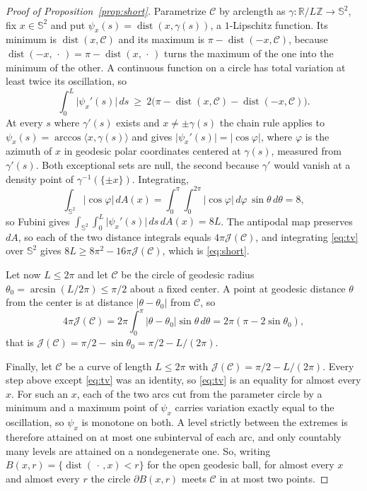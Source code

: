 \documentclass[11pt,oneside,reqno]{amsart}
\theoremstyle{plain}
\theoremstyle{definition}
\DeclareMathOperator{\dist}{dist}
\newcommand{\Sph}{\mathbb{S}^{2}}
\newcommand{\R}{\mathbb{R}}
\begin{document}
\begin{proof}[Proof of Proposition~\ref{prop:short}]
Parametrize $\mathcal{C}$ by arclength as $\gamma\colon\R/L\mathbb{Z}\to\Sph$, fix
$x\in\Sph$ and put $\psi_{x}(s)=\dist(x,\gamma(s))$, a $1$-Lipschitz function.
Its minimum is $\dist(x,\mathcal{C})$ and its maximum is
$\pi-\dist(-x,\mathcal{C})$, because $\dist(-x,\,\cdot\,)=\pi-\dist(x,\,\cdot\,)$
turns the maximum of the one into the minimum of the other. A continuous
function on a circle has total variation at least twice its oscillation, so
\begin{equation}\label{eq:tv}
  \int_{0}^{L}\lvert\psi_{x}'(s)\rvert\,ds\ \ge\
  2\bigl(\pi-\dist(x,\mathcal{C})-\dist(-x,\mathcal{C})\bigr).
\end{equation}
At every $s$ where $\gamma'(s)$ exists and $x\ne\pm\gamma(s)$ the chain rule
applies to $\psi_{x}(s)=\arccos\langle x,\gamma(s)\rangle$ and gives
$\lvert\psi_{x}'(s)\rvert=\lvert\cos\varphi\rvert$, where $\varphi$ is the azimuth
of $x$ in geodesic polar coordinates centered at $\gamma(s)$, measured from
$\gamma'(s)$. Both exceptional sets are null, the second because $\gamma'$ would
vanish at a density point of $\gamma^{-1}(\{\pm x\})$. Integrating,
\[
  \int_{\Sph}\lvert\cos\varphi\rvert\,dA(x)
  =\int_{0}^{\pi}\!\!\int_{0}^{2\pi}\lvert\cos\varphi\rvert\,d\varphi\,\sin\theta\,d\theta
  =8 ,
\]
so Fubini gives $\int_{\Sph}\int_{0}^{L}\lvert\psi_{x}'(s)\rvert\,ds\,dA(x)=8L$. The
antipodal map preserves $dA$, so each of the two distance integrals equals
$4\pi\mathcal{J}(\mathcal{C})$, and integrating \eqref{eq:tv} over $\Sph$ gives
$8L\ge8\pi^{2}-16\pi\mathcal{J}(\mathcal{C})$, which is \eqref{eq:short}.

Let now $L\le2\pi$ and let $\mathcal{C}$ be the circle of geodesic radius
$\theta_{0}=\arcsin(L/2\pi)\le\pi/2$ about a fixed center. A point at geodesic
distance $\theta$ from the center is at distance $\lvert\theta-\theta_{0}\rvert$
from $\mathcal{C}$, so
\[
  4\pi \mathcal{J}(\mathcal{C})
  =2\pi\int_{0}^{\pi}\lvert\theta-\theta_{0}\rvert\sin\theta\,d\theta
  =2\pi(\pi-2\sin\theta_{0}),
\]
that is $\mathcal{J}(\mathcal{C})=\pi/2-\sin\theta_{0}=\pi/2-L/(2\pi)$.

Finally, let $\mathcal{C}$ be a curve of length $L\le2\pi$ with
$\mathcal{J}(\mathcal{C})=\pi/2-L/(2\pi)$. Every step above except \eqref{eq:tv}
was an identity, so \eqref{eq:tv} is an equality for almost every $x$. For such
an $x$, each of the two arcs cut from the parameter circle by a minimum and a
maximum point of $\psi_{x}$ carries variation exactly equal to the oscillation,
so $\psi_{x}$ is monotone on both. A level strictly between the extremes is
therefore attained on at most one subinterval of each arc, and only countably
many levels are attained on a nondegenerate one. So, writing
$B(x,r)=\{\dist(\,\cdot\,,x)<r\}$ for the open geodesic ball, for almost every
$x$ and almost every $r$ the circle $\partial B(x,r)$ meets $\mathcal{C}$ in at
most two points.


\end{proof}
\end{document}
